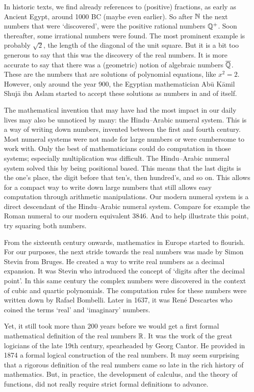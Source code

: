 In historic texts, we find already references to (positive) fractions, as early as Ancient Egypt, around 1000 BC (maybe even earlier). So after $\mathbb{N}$ the next numbers that were `discovered', were the positive rational numbers $\mathbb{Q}^+$. Soon thereafter, some irrational numbers were found. The most prominent example is probably $\sqrt{2}$, the length of the diagonal of the unit square. But it is a bit too generous to say that this was the discovery of the real numbers. It is more accurate to say that there was a (geometric) notion of algebraic numbers $\overline{\mathbb{Q}}$. These are the numbers that are solutions of polynomial equations, like $x^2 = 2$. However, only around the year 900, the Egyptian mathematician Abū Kāmil Shujā ibn Aslam started to accept these solutions as numbers in and of itself.

The mathematical invention that may have had the most impact in our daily lives may also be unnoticed by many: the Hindu--Arabic numeral system. This is a way of writing down numbers, invented between the first and fourth century. Most numeral systems were not made for large numbers or were cumbersome to work with. Only the best of mathematicians could do computation in those systems; especially multiplication was difficult. The Hindu--Arabic numeral system solved this by being positional based. This means that the last digits is the one's place, the digit before that ten's, then hundred's, and so on. This allows for a compact way to write down large numbers that still allows easy computation through arithmetic manipulations. Our modern numeral system is a direct descendant of the Hindu--Arabic numeral system. Compare for example the Roman numeral \uppercase\expandafter{\relax} to our modern equivalent $3846$. And to help illustrate this point, try squaring both numbers.

From the sixteenth century onwards, mathematics in Europe started to flourish. For our purposes, the next stride towards the real numbers was made by Simon Stevin from Bruges. He created a way to write real numbers as a decimal expansion. It was Stevin who introduced the concept of `digits after the decimal point'. In this same century the complex numbers were discovered in the context of cubic and quartic polynomials. The computation rules for these numbers were written down by Rafael Bombelli. Later in 1637, it was René Descartes who coined the terms `real' and `imaginary' numbers.~\cite{katz_history_2008}

Yet, it still took more than 200 years before we would get a first formal mathematical definition of the real numbers $\mathbb{R}$. It was the work of the great logicians of the late 19th century, spearheaded by Georg Cantor. He provided in 1874 a formal logical construction of the real numbers. It may seem surprising that a rigorous definition of the real numbers came so late in the rich history of mathematics. But, in practice, the development of calculus, and the theory of functions, did not really require strict formal definitions to advance.

